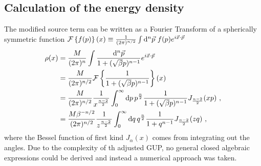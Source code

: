 \subsection{Calculation of the energy density}
The modified source term can be written as a Fourier Transform of a spherically 
symmetric function 
$\mathcal{F}\left\{ f(p) \right\}(x) \equiv \frac{1}{(2\pi)^{n/2}} \int\mathrm{d}^n 
\vec{p}\ f(p) e^{i \vec{x}\cdot\vec{p}}$
\begin{align}
\rho(x) &= \frac{M}{(2\pi)^{n}} \int \frac{\mathrm{d}^n\vec{p}}{1 + 
(\sqrt{\beta} p)^{n-1} }e^{i \vec{x}\cdot\vec{p}} \\
&= \frac{M}{(2\pi)^{n/2}} \mathcal{F}\left\{ \frac{1}{1+(\sqrt{\beta} p)^{n-1}} 
\right\}(x) \\
&= \frac{M}{(2\pi)^{n/2}} \frac{1}{x^{\frac{n-2}{2}}} \int_0^\infty \mathrm{d} p\, 
p^{\frac{n}{2}}
    \frac{1}{1+(\sqrt{\beta} p)^{n-1}} J_{\frac{n-2}{2}}(x p)\ ,
    \label{eq:source}
\\
&= \frac{M \beta^{-n/2}}{(2\pi)^{n/2}} \frac{1}{z^{\frac{n-2}{2}}} 
\int_0^\infty 
\mathrm{d} q\, 
q^{\frac{n}{2}}
\frac{1}{1+q^{n-1}} J_{\frac{n-2}{2}}(zq)\ ,
\label{eq:rho-ndim-integral}
\end{align}
where the Bessel function of first kind $J_\alpha(x)$ comes from 
integrating out the angles. Due to the complexity of th adjusted
GUP, no general closed algebraic expressions could be derived and
instead a numerical approach was taken.

